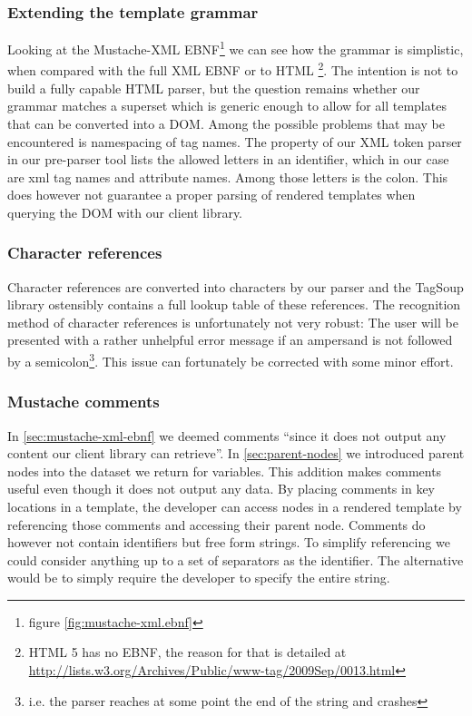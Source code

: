 \documentclass[thesis.tex]{subfiles}
\begin{document}
\subsubsection{Extending the template grammar}
Looking at the Mustache-XML EBNF\footnote{figure \ref{fig:mustache-xml.ebnf}} we
can see how the grammar is simplistic, when compared with the
full XML \cite[section 2/\#sec-documents]{XMLSPEC} EBNF or to
HTML \cite{HTMLSPEC}\footnote{
	HTML 5 has no EBNF, the reason for that is detailed at
	\url{http://lists.w3.org/Archives/Public/www-tag/2009Sep/0013.html}
}. The intention is not to build a fully capable HTML parser, but the question
remains whether our grammar matches a superset which is generic enough to allow
for all templates that can be converted into a DOM. Among the possible problems
that may be encountered is namespacing of tag names. The 
\cite[\#v:identLetter]{PARSECDOC} property of our XML token parser in our
pre-parser tool lists the allowed letters in an identifier,
which in our case are xml tag names and attribute names. Among those letters is
the colon. This does however not guarantee a proper parsing of rendered
templates when querying the DOM with our client library.

\subsubsection{Character references}
Character references are converted into characters by our parser and the
TagSoup library ostensibly contains a full lookup table of these references.
The recognition method of character references is unfortunately not very robust:
The user will be presented with a rather unhelpful error message if an ampersand
is not followed by a semicolon\footnote{
	i.e. the parser reaches at some point the end of the string and crashes
}. This issue can fortunately be corrected with some minor effort.

\subsubsection{Mustache comments}
In \ref{sec:mustache-xml-ebnf} we deemed comments ``since it does not
output any content our client library can retrieve''. In \ref{sec:parent-nodes}
we introduced parent nodes into the dataset we return for variables.
This addition makes comments useful even though it does not output any data.
By placing comments in key locations in a template, the developer can access
nodes in a rendered template by referencing those comments and accessing their
parent node. Comments do however not contain identifiers but free form strings.
To simplify referencing we could consider anything up to a set of
separators as the identifier. The alternative would be to simply require the
developer to specify the entire string.
\end{document}
